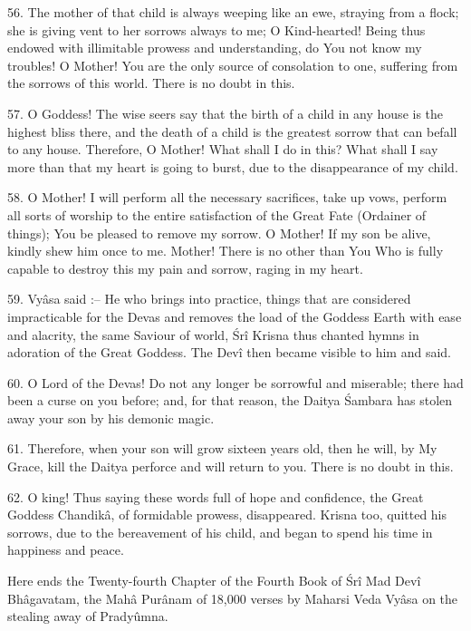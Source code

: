 56. The mother of that child is always weeping like an ewe, straying from a flock; she is giving vent to her sorrows always to me; O Kind-hearted! Being thus endowed with illimitable prowess and understanding, do You not know my troubles! O Mother! You are the only source of consolation to one, suffering from the sorrows of this world. There is no doubt in this.

57. O Goddess! The wise seers say that the birth of a child in any house is the highest bliss there, and the death of a child is the greatest sorrow that can befall to any house. Therefore, O Mother! What shall I do in this? What shall I say more than that my heart is going to burst, due to the disappearance of my child.

58. O Mother! I will perform all the necessary sacrifices, take up vows, perform all sorts of worship to the entire satisfaction of the Great Fate (Ordainer of things); You be pleased to remove my sorrow. O Mother! If my son be alive, kindly shew him once to me. Mother! There is no other than You Who is fully capable to destroy this my pain and sorrow, raging in my heart.

59. Vy\^asa said :-- He who brings into practice, things that are considered impracticable for the Devas and removes the load of the Goddess Earth with ease and alacrity, the same Saviour of world, \'Sr\^i Krisna thus chanted hymns in adoration of the Great Goddess. The Dev\^i then became visible to him and said.

60. O Lord of the Devas! Do not any longer be sorrowful and miserable; there had been a curse on you before; and, for that reason, the Daitya \'Sambara has stolen away your son by his demonic magic.

61. Therefore, when your son will grow sixteen years old, then he will, by My Grace, kill the Daitya perforce and will return to you. There is no doubt in this.

62. O king! Thus saying these words full of hope and confidence, the Great Goddess Chandik\^a, of formidable prowess, disappeared. Krisna too, quitted his sorrows, due to the bereavement of his child, and began to spend his time in happiness and peace.

Here ends the Twenty-fourth Chapter of the Fourth Book of \'Sr\^i Mad Dev\^i Bh\^agavatam, the Mah\^a Pur\^anam of 18,000 verses by Maharsi Veda Vy\^asa on the stealing away of Pradyûmna.